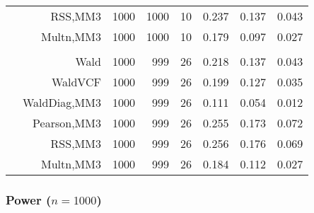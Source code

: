 \documentclass[
]{article}
\begin{document}
\begin{table}[H]
{\begin{tabular}[t]{lrrrrrrr}
\hspace{1em} & RSS,MM3 & 1000 & 1000 & 10 & 0.237 & 0.137 & 0.043\\

\hspace{1em} & Multn,MM3 & 1000 & 1000 & 10 & 0.179 & 0.097 & 0.027\\
\cmidrule{1-8}
\addlinespace[0.3em]
\multicolumn{8}{l}{\textbf{3F 15V}}\\
\hspace{1em} & Wald & 1000 & 999 & 26 & 0.218 & 0.137 & 0.043\\

\hspace{1em} & WaldVCF & 1000 & 999 & 26 & 0.199 & 0.127 & 0.035\\

\hspace{1em} & WaldDiag,MM3 & 1000 & 999 & 26 & 0.111 & 0.054 & 0.012\\

\hspace{1em} & Pearson,MM3 & 1000 & 999 & 26 & 0.255 & 0.173 & 0.072\\

\hspace{1em} & RSS,MM3 & 1000 & 999 & 26 & 0.256 & 0.176 & 0.069\\

\hspace{1em} & Multn,MM3 & 1000 & 999 & 26 & 0.184 & 0.112 & 0.027\\
\bottomrule
\end{tabular}}
\endgroup{}
\end{table}

\subsubsection{\texorpdfstring{Power
(\(n=1000\))}{Power (n=1000)}}\label{power-n1000}
\end{document}
